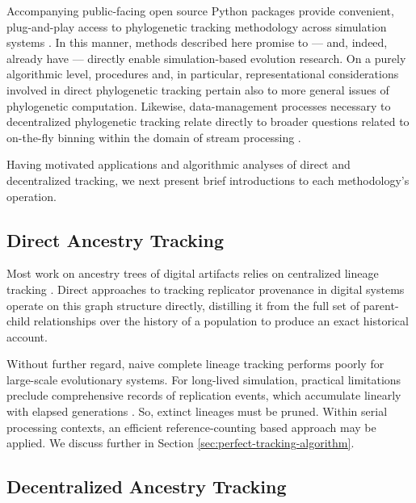 Accompanying public-facing open source Python packages provide convenient, plug-and-play access to phylogenetic tracking methodology across simulation systems \citep{moreno2022hstrat,dolson2023phylotrackpy}.
In this manner, methods described here promise to --- and, indeed, already have --- directly enable simulation-based evolution research.
On a purely algorithmic level, procedures and, in particular, representational considerations involved in direct phylogenetic tracking pertain also to more general issues of phylogenetic computation.
Likewise, data-management processes necessary to decentralized phylogenetic tracking relate directly to broader questions related to on-the-fly binning within the domain of stream processing \citep{OTHERPREPRINT}. %

Having motivated applications and algorithmic analyses of direct and decentralized tracking, we next present brief introductions to each methodology's operation.

\subsection{Direct Ancestry Tracking}

Most work on ancestry trees of digital artifacts relies on centralized lineage tracking \citep{friggeri2014rumor,cohen1987computer,dolson2023phylotrackpy}.
Direct approaches to tracking replicator provenance in digital systems operate on this graph structure directly, distilling it from the full set of parent-child relationships over the history of a population to produce an exact historical account.

Without further regard, naive complete lineage tracking performs poorly for large-scale evolutionary systems.
For long-lived simulation, practical limitations preclude comprehensive records of replication events, which accumulate linearly with elapsed generations \citep{dolson2023algorithms}.
So, extinct lineages must be pruned.
Within serial processing contexts, an efficient reference-counting based approach may be applied.
We discuss further in Section \ref{sec:perfect-tracking-algorithm}.

\subsection{Decentralized Ancestry Tracking}

